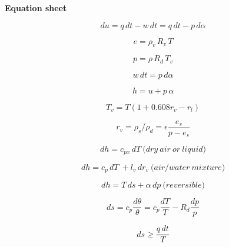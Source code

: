\documentclass[12pt]{article}
\begin{document}
\newpage
\begin{center}
  \textbf{Equation sheet}
\end{center}

\begin{multicols}{2}

  \begin{equation}
\label{eq:first}
du = q\,dt - w\,dt = q\,dt - p\,d\alpha
  \end{equation}

\begin{equation}
e = \rho_v\, R_v\, T
\end{equation}

\begin{equation}
p = \rho\, R_d\, T_v
\end{equation}


\begin{equation}
w \,dt = p\,d\alpha
\end{equation}

\begin{equation}
h = u + p \,\alpha
\end{equation}

\begin{equation}
  \label{eq:tv}
  T_v = T(1 + 0.608 r_v - r_l)
\end{equation}

\begin{equation}
  \label{eq:wv}
  r_v = \rho_s/\rho_d = \epsilon \frac{e_s}{p - e_s}
\end{equation}

\begin{equation}
dh = c_{px}\, dT\ \mathrm(dry\ air\ or\ liquid)
\end{equation}

\begin{equation}
dh = c_p\, dT\ + l_v\,dr_v\ \mathrm(air/water\ mixture)
\end{equation}


\begin{equation}
dh = T\,ds + \alpha\,dp\ \mathrm(reversible)
\end{equation}

\begin{equation}
ds = c_p \frac{d\theta}{\theta} = c_p \frac{dT}{T} - R_d \frac{dp}{p}
\end{equation}

\begin{equation}
  \label{eq:ds}
  ds \geq \frac{q\,dt}{T}
\end{equation}


\end{multicols}
\end{document}

